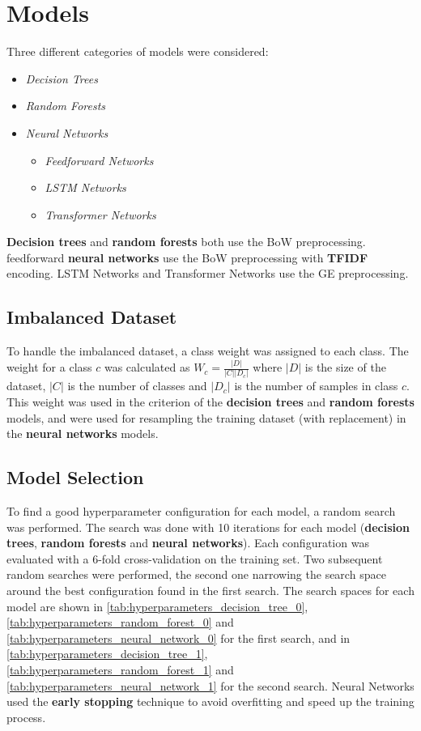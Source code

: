 \section{Models}
\label{sec:models}
Three different categories of models were
considered:
\begin{itemize}
    \item \textit{Decision Trees}
    \item \textit{Random Forests}
    \item \textit{Neural Networks}
    \begin{itemize}
        \item \textit{Feedforward Networks}
        \item \textit{LSTM Networks}
        \item \textit{Transformer Networks}
    \end{itemize}
\end{itemize}
\textbf{Decision trees} and \textbf{random forests} 
both use the BoW preprocessing.
feedforward \textbf{neural networks} use the BoW
preprocessing with \textbf{TFIDF} encoding.
LSTM Networks and Transformer Networks
use the GE preprocessing.

\subsection{Imbalanced Dataset}
To handle the imbalanced dataset, a class
weight was assigned to each class. The weight
for a class $c$ was calculated as
$W_c=\frac{|D|}{|C||D_c|}$ where $|D|$ is
the size of the dataset, $|C|$ is the number
of classes and $|D_c|$ is the number of
samples in class $c$. This weight was used in
the criterion of the \textbf{decision trees} 
and \textbf{random forests} models, and 
were used for resampling the training dataset
(with replacement) in the 
\textbf{neural networks} models.

\subsection{Model Selection}
To find a good hyperparameter configuration
for each model, a random search was performed.
The search was done with 10 iterations for
each model (\textbf{decision trees}, \textbf{random forests} 
and \textbf{neural networks}). Each configuration was
evaluated with a 6-fold cross-validation on
the training set. Two subsequent random
searches were performed, the second one
narrowing the search space around the best
configuration found in the first search.
The search spaces for each model are shown
in \autoref{tab:hyperparameters_decision_tree_0}, 
\autoref{tab:hyperparameters_random_forest_0} and 
\autoref{tab:hyperparameters_neural_network_0} for the 
first search, and in 
\autoref{tab:hyperparameters_decision_tree_1},
\autoref{tab:hyperparameters_random_forest_1} and
\autoref{tab:hyperparameters_neural_network_1} for the
second search.
Neural Networks used the \textbf{early stopping}
technique to avoid overfitting and speed up the
training process.


